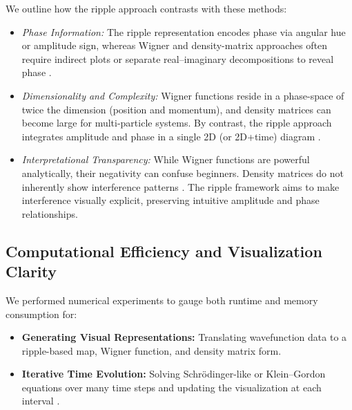 \documentclass{article}
\begin{document}
We outline how the ripple approach contrasts with these methods:
\begin{itemize}
  \item \textit{Phase Information:} The ripple representation encodes phase via angular hue or amplitude sign, whereas Wigner and density-matrix approaches often require indirect plots or separate real--imaginary decompositions to reveal phase \cite{schleich2001quantum}.
  \item \textit{Dimensionality and Complexity:} Wigner functions reside in a phase-space of twice the dimension (position and momentum), and density matrices can become large for multi-particle systems. By contrast, the ripple approach integrates amplitude and phase in a single 2D (or 2D+time) diagram \cite{feynmanlectures}.
  \item \textit{Interpretational Transparency:} While Wigner functions are powerful analytically, their negativity can confuse beginners. Density matrices do not inherently show interference patterns \cite{griffiths2005introduction}. The ripple framework aims to make interference visually explicit, preserving intuitive amplitude and phase relationships.
\end{itemize}

\subsection{Computational Efficiency and Visualization Clarity}
\label{subsec:comp-efficiency}
We performed numerical experiments to gauge both runtime and memory consumption for:
\begin{itemize}
  \item \textbf{Generating Visual Representations:} Translating wavefunction data to a ripple-based map, Wigner function, and density matrix form.
  \item \textbf{Iterative Time Evolution:} Solving Schr\"odinger-like or Klein--Gordon equations over many time steps and updating the visualization at each interval \cite{nielsenchuang2000}.
\end{itemize}
\end{document}
